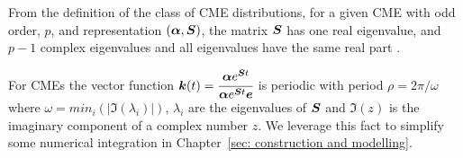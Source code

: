 From the definition of the class of CME distributions, for a given CME with odd order, \(p\), and representation \((\boldsymbol\alpha,\boldsymbol S)\), the matrix \(\boldsymbol S\) has one real eigenvalue, and \(p-1\) complex eigenvalues and all eigenvalues have the same real part \citep{hht2020}. 

For CMEs the vector function \(\boldsymbol k(t)=\cfrac{\boldsymbol \alpha e^{\boldsymbol St}}{\boldsymbol \alpha e^{\boldsymbol St}\boldsymbol e}\) is periodic with period \(\rho = 2\pi/\omega\) where \(\omega=min_i(|\Im(\lambda_i)|)\), \(\lambda_i\) are the eigenvalues of \(\boldsymbol{S}\) and \(\Im(z)\) is the imaginary component of a complex number \(z\). We leverage this fact to simplify some numerical integration in Chapter~\ref{sec: construction and modelling}. 


%
